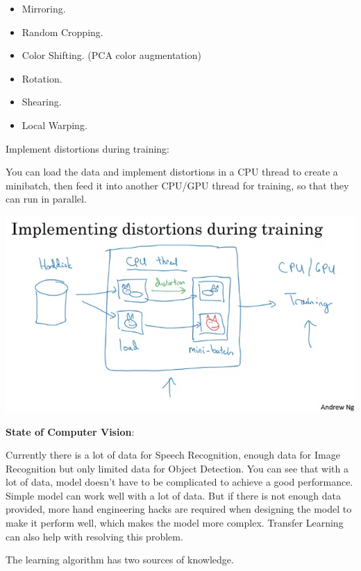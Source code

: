 \documentclass{article}
\begin{document}
\begin{itemize}
    \item Mirroring.
    \item Random Cropping.
    \item Color Shifting. (PCA color augmentation)
    \item Rotation.
    \item Shearing.
    \item Local Warping.
\end{itemize}

\noindent Implement distortions during training:

\noindent You can load the data and implement distortions in a CPU thread to create a minibatch, then feed it into another CPU/GPU thread for training, so that they can run in parallel.

\begin{center}
\includegraphics[scale=0.5]{./images/data_augmentation_distortions.png}
\end{center}

\noindent \textbf{State of Computer Vision}:

\noindent Currently there is a lot of data for Speech Recognition, enough data for Image Recognition but only limited data for Object Detection. You can see that with a lot of data, model doesn't have to be complicated to achieve a good performance. Simple model can work well with a lot of data. But if there is not enough data provided, more hand engineering hacks are required when designing the model to make it perform well, which makes the model more complex. Transfer Learning can also help with resolving this problem.

\bigskip

\noindent The learning algorithm has two sources of knowledge.
\end{document}
